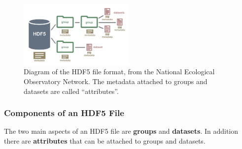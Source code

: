 \documentclass[10pt]{exam}
\begin{document}
			\begin{figure}[h]
				\centering
				\includegraphics[width=0.5\textwidth]{hdf5_structure4}
				\caption{Diagram of the HDF5 file format, from the National Ecological Observatory Network. The metadata attached to groups and datasets are called ``attributes''.}
			\end{figure}
	
		\subsubsection{Components of an HDF5 File}	
			\noindent The two main aspects of an HDF5 file are \textbf{groups} and \textbf{datasets}. In addition there are \textbf{attributes} that can be attached to groups and datasets.
\end{document}
